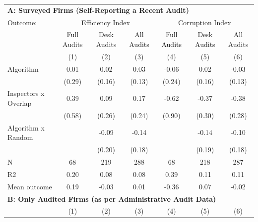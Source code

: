 \begin{tabular}{lccc|ccc} \toprule
\multicolumn{7}{l}{\textbf{A: Surveyed Firms (Self-Reporting a Recent Audit)}} \\ \multicolumn{1}{l}{Outcome:} & \multicolumn{3}{c}{Efficiency Index} & \multicolumn{3}{c}{Corruption Index} \\ \multicolumn{1}{l}{} & Full Audits & Desk Audits & All Audits & Full Audits & Desk Audits & All Audits \\ \multicolumn{1}{l}{} & (1) & (2) & (3) & (4) & (5) & (6) \\ \midrule
Algorithm   &        0.01         &        0.02         &        0.03         &       -0.06         &        0.02         &       -0.03         \\
            &      (0.29)         &      (0.16)         &      (0.13)         &      (0.24)         &      (0.16)         &      (0.13)         \\
\addlinespace
Inspectors x Overlap&        0.39         &        0.09         &        0.17         &       -0.62         &       -0.37         &       -0.38         \\
            &      (0.58)         &      (0.26)         &      (0.24)         &      (0.90)         &      (0.30)         &      (0.28)         \\
\addlinespace
Algorithm x Random&                     &       -0.09         &       -0.14         &                     &       -0.14         &       -0.10         \\
            &                     &      (0.20)         &      (0.18)         &                     &      (0.19)         &      (0.18)         \\
\midrule
N           &          68         &         219         &         288         &          68         &         218         &         287         \\
R2          &        0.20         &        0.08         &        0.08         &        0.39         &        0.11         &        0.11         \\
Mean outcome&        0.19         &       -0.03         &        0.01         &       -0.36         &        0.07         &       -0.02         \\

\midrule \multicolumn{7}{l}{\textbf{B: Only Audited Firms (as per Administrative Audit Data)}} \\ \multicolumn{1}{l}{} & (1) & (2) & (3) & (4) & (5) & (6) \\ \midrule


\end{tabular}
